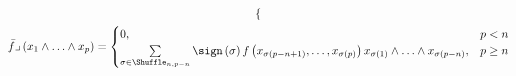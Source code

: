 \begin{example}{}{}
\begin{enumerate}
\begin{gather*}
\begin{cases}
			\end{cases}\\
			\bar{f}\lrcorner\left(x_{1}\wedge\ldots\wedge x_{p}\right)=
			\begin{cases}
				0,&p<n\\
				\sum\limits_{\sigma\in\Shuffle_{n,p-n}}\sign\left(\sigma\right)f\left(x_{\sigma\left(p-n+1\right)},\ldots,x_{\sigma\left(p\right)}\right)x_{\sigma\left(1\right)}\wedge\ldots\wedge x_{\sigma\left(p-n\right)},&p\geq n
			\end{cases}
		\end{gather*}
	\end{enumerate}
\end{example}

































































